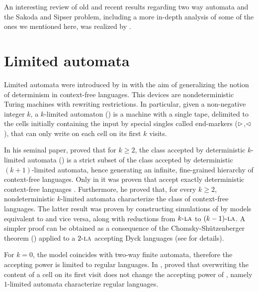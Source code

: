 An interesting review of old and recent results regarding two way automata and the Sakoda and Sipser problem, including a more in-depth analysis of some of the ones we mentioned here, was realized by .


\section{Limited automata}
Limited automata were introduced by  in \citeyear{Hib67} with the aim of generalizing the notion of determinism in context-free languages.
This devices are nondeterministic Turing machines with rewriting restrictions.
In particular, given a non-negative integer $k$, a $k$-limited automaton (\kLA) is a machine with a single tape, delimited to the cells initially containing the input by special singles called end-markers ($\rhd$,$\lhd$), that can only write on each cell on its first $k$ visits.

In his seminal paper, \citeauthor{Hib67} proved that for $k\ge2$, the class accepted by deterministic $k$-limited automata (\kDLA) is a strict subset of the class accepted by deterministic $(k+1)$-limited automata, hence generating an infinite, fine-grained hierarchy of context-free languages.
Only in \citeyear{PigPis15} it was proven that  accept exactly deterministic context-free languages \cite{PigPis15}.
Furthermore, he proved that, for every $k\ge2$, nondeterministic $k$-limited automata characterize the class of context-free languages.
The latter result was proven by constructing simulations of  by models equivalent to \PDAs and vice versa, along with reductions from $k\textsc{-la}$ to $(k-1)\textsc{-la}$.
A simpler proof can be obtained as a consequence of the Chomsky-Shützenberger theorem (\cite{ChoSch63}) applied to a $2\textsc{-la}$ accepting Dyck languages (see \cite{Pig19} for details).

For $k=0$, the model coincides with two-way finite automata, therefore the accepting power is limited to regular languages.
In \citeyear{WagWec86}, \citeauthor{WagWec86} proved that overwriting the content of a cell on its first visit does not change the accepting power of \TNFAs, namely $1$-limited automata characterize regular languages.

